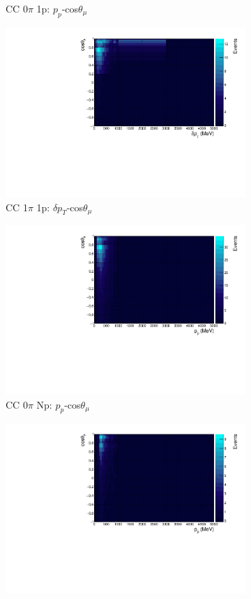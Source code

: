 \begin{figure}
\begin{subfigure}{.49\textwidth}
  \caption{CC 0$\pi$ 1p: $p_{p}$-cos$\theta_{\mu}$}
\end{subfigure}
\begin{subfigure}{.49\textwidth}
  \centering
  \includegraphics[width=0.9\linewidth]{figs/hptpc_sigvar_cc1pi1p.pdf}
  \caption{CC 1$\pi$ 1p: $\delta p_{T}$-cos$\theta_{\mu}$}
\end{subfigure}
\begin{subfigure}{.49\textwidth}
  \centering
  \includegraphics[width=0.9\linewidth]{figs/hptpc_sigvar_cc0piNp.pdf}
  \caption{CC 0$\pi$ Np: $p_{p}$-cos$\theta_{\mu}$}
\end{subfigure}
\begin{subfigure}{.49\textwidth}
  \centering
  \includegraphics[width=0.9\linewidth]{figs/hptpc_sigvar_cc1piNp.pdf}

\end{subfigure}
\end{figure}
